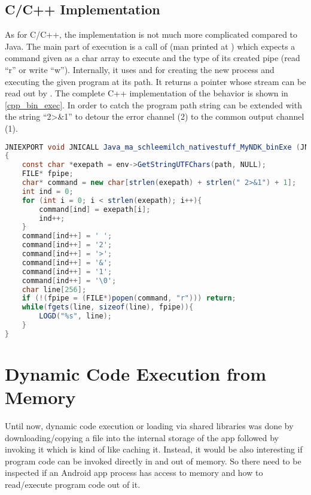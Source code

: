 \subsection{C/C++ Implementation}\label{dyn_bin_c}
As for C/C++, the implementation is not much more complicated compared to Java.
The main part of execution is a call of  
(man printed at \parencite{popen}) which expects a command 
given as a char array to execute and the type of its created pipe (read ``r'' or write ``w''). Internally, it uses  and  for creating the new 
process and executing the given program at its path. It returns a  pointer
whose stream can be read out by . The complete C++ implementation
of the behavior is shown in \autoref{cpp_bin_exec}. In order to catch 
the program path string can be extended with the string ``2>\&1'' to detour the error
channel (2) to the common output channel (1).
\begin{lstlisting}[language=Java, caption=C++ Native Exec(), label=cpp_bin_exec]
JNIEXPORT void JNICALL Java_ma_schleemilch_nativestuff_MyNDK_binExe (JNIEnv *env, object obj, jstring path)
{
	const char *exepath = env->GetStringUTFChars(path, NULL);
	FILE* fpipe;
	char* command = new char[strlen(exepath) + strlen(" 2>&1") + 1];
	int ind = 0;
	for (int i = 0; i < strlen(exepath); i++){
		command[ind] = exepath[i];
		ind++;
	}
	command[ind++] = ' ';
	command[ind++] = '2';
	command[ind++] = '>';
	command[ind++] = '&';
	command[ind++] = '1';
	command[ind++] = '\0';
	char line[256];
	if (!(fpipe = (FILE*)popen(command, "r"))) return;
	while(fgets(line, sizeof(line), fpipe)){
		LOGD("%s", line);
	}
}
\end{lstlisting}

\section{Dynamic Code Execution from Memory}\label{dyn_code_memory}

Until now, dynamic code execution or loading via shared libraries was done
by downloading/copying a file into the internal storage of the app followed
by invoking it which is kind of like caching it. Instead,
it would be also interesting if program code can be invoked directly in and out
of memory. So there need to be inspected if an Android app process has access
to memory and how to read/execute program code out of it.   